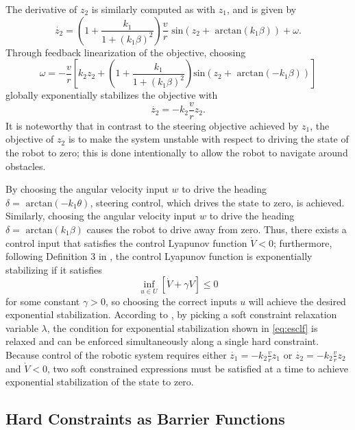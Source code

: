 \documentclass[journal]{IEEEtran}
\begin{document}
The derivative of $z_2$ is similarly computed as with $z_1$, and is given by $$\dot{z_2}=\left( 1+\frac{k_1}{1+(k_1\beta)^2}\right) \frac{v}{r}\text{ sin}(z_2+\text{ arctan}(k_1\beta))+\omega.$$ Through feedback linearization of the objective, choosing $$\omega = -\frac{v}{r}\left[ k_2 z_2+\left( 1 + \frac{k_1}{1+(k_1\beta)^2} \right) \text{sin}(z_2+\text{ arctan}(-k_1\beta))\right]$$ globally exponentially stabilizes the objective with $$\dot{z_2}=-k_2\frac{v}{r}z_2.$$ It is noteworthy that in contrast to the steering objective achieved by $z_1$, the objective of $z_2$ is to make the system unstable with respect to driving the state of the robot to zero; this is done intentionally to allow the robot to navigate around obstacles.

By choosing the angular velocity input $w$ to drive the heading $\delta=\text{ arctan}(-k_1\theta)$, steering control, which drives the state to zero, is achieved. Similarly, choosing the angular velocity input $w$ to drive the heading $\delta=\text{ arctan}(k_1\beta)$ causes the robot to drive away from zero. Thus, there exists a control input that satisfies the control Lyapunov function $\dot{V}<0$; furthermore, following Definition 3 in \cite{ames2014esclf}, the control Lyapunov function is exponentially stabilizing if it satisfies
\begin{equation}
\inf_{u\in U}\left[ \dot{V}+\gamma V \right] \leq 0
\label{eq:esclf}
\end{equation}
for some constant $\gamma >0$, so choosing the correct inputs $u$ will achieve the desired exponential stabilization. According to \cite{amesACC}, by picking a soft constraint relaxation variable $\lambda$, the condition for exponential stabilization shown in \eqref{eq:esclf} is relaxed and can be enforced simultaneously along a single hard constraint. Because control of the robotic system requires either $\dot{z_1}=-k_2\frac{v}{r}z_1$ or $\dot{z_2}=-k_2\frac{v}{r}z_2$ and $\dot{V}<0$, two soft constrained expressions must be satisfied at a time to achieve exponential stabilization of the state to zero.

\subsection{Hard Constraints as Barrier Functions}


\end{document}
